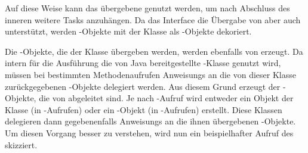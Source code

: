 Auf diese Weise kann das übergebene \classCompletableFuture{} genutzt werden, um nach Abschluss des inneren \classCallable{} weitere Tasks anzuhängen.
Da das Interface \classExecutorService{} die Übergabe von \classRunnable{} aber auch \classCallable{} unterstützt, werden \classRunnable{}-Objekte mit der Klasse \classRunnableCallable{} als \classCallable{}-Objekte dekoriert.  

Die \classCompletableFuture{}-Objekte, die der Klasse \classCompletingCallable{} übergeben werden, werden ebenfalls von \classCompletableFutureWrapper{} erzeugt. Da intern für die Ausführung die von Java bereitgestellte \classScheduledThreadPoolExecutor{}-Klasse genutzt wird, müssen bei bestimmten Methodenaufrufen \glspl{Anweisung} an die von dieser Klasse zurückgegebenen \classFuture{}-Objekte delegiert werden. Aus diesem Grund erzeugt der 
\classCompletableFutureWrapper{}-Objekte, die von \classCompletableFuture{} abgeleitet sind. Je nach \classExecutor{}-Aufruf wird entweder ein Objekt der Klasse \classDelegatingCompletableFuture{} (in -Aufrufen) oder ein \classDelegatingScheduledCompletableFuture{}-Objekt (in -Aufrufen) erstellt. Diese Klassen delegieren dann gegebenenfalls \glspl{Anweisung} an die ihnen übergebenen \classFuture{}-Objekte. Um diesen Vorgang besser zu verstehen, wird nun ein beispielhafter Aufruf des \classBlocklibExecutor{} skizziert.

